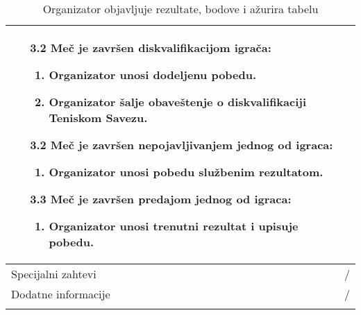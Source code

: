 \documentclass{article}
\begin{document}
\begin{longtable}{| p{} | p{} |}
\begin{enumerate}
        \item [3.2] Meč je završen diskvalifikacijom igrača: \begin{enumerate}
                    \item Organizator unosi dodeljenu pobedu.
                    \item Organizator šalje obaveštenje o diskvalifikaciji Teniskom Savezu.
                    \end{enumerate}
        \item [3.2] Meč je završen nepojavljivanjem jednog od igraca: \begin{enumerate}
            \item Organizator unosi pobedu službenim rezultatom.
        \end{enumerate}
        \item [3.3] Meč je završen predajom jednog od igraca: \begin{enumerate}
            \item Organizator unosi trenutni rezultat i upisuje pobedu.
        \end{enumerate}
    \end{enumerate}\\
\hline
    Specijalni zahtevi & /\\
\hline
    Dodatne informacije & / \\
\hline

\caption{Organizator objavljuje rezultate, bodove i ažurira tabelu} 
\end{longtable}
\end{document}

